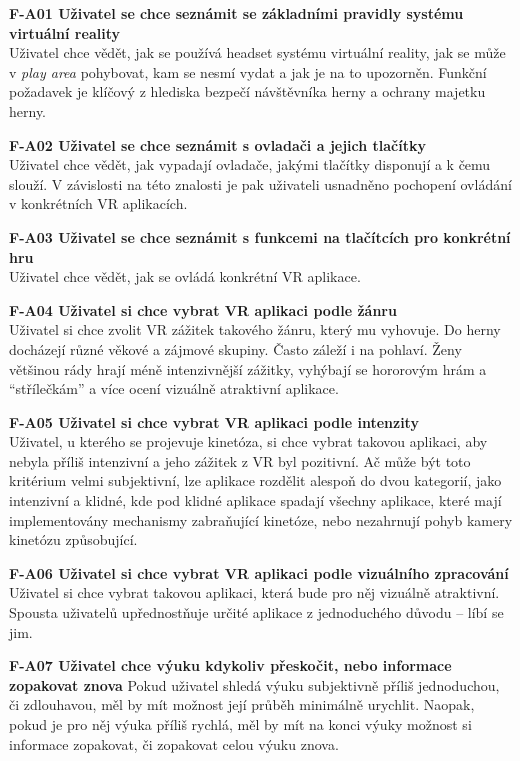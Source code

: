 \textbf{F-A01 Uživatel se chce seznámit se základními pravidly systému
virtuální reality}\\
Uživatel chce vědět, jak se používá headset systému virtuální reality,
jak se může v \emph{play area} pohybovat, kam se nesmí vydat a jak je na
to upozorněn. Funkční požadavek je klíčový z hlediska bezpečí
návštěvníka herny a ochrany majetku herny.

\textbf{F-A02 Uživatel se chce seznámit s ovladači a jejich tlačítky}\\
Uživatel chce vědět, jak vypadají ovladače, jakými tlačítky disponují a
k čemu slouží. V závislosti na této znalosti je pak uživateli usnadněno
pochopení ovládání v konkrétních VR aplikacích.

\textbf{F-A03 Uživatel se chce seznámit s funkcemi na tlačítcích pro
konkrétní hru}\\
Uživatel chce vědět, jak se ovládá konkrétní VR aplikace.

\textbf{F-A04 Uživatel si chce vybrat VR aplikaci podle žánru}\\
Uživatel si chce zvolit VR zážitek takového žánru, který mu vyhovuje. Do
herny docházejí různé věkové a zájmové skupiny. Často záleží i na
pohlaví. Ženy většinou rády hrají méně intenzivnější zážitky, vyhýbají
se hororovým hrám a ``střílečkám'' a více ocení vizuálně atraktivní
aplikace. \autocite{ladiespreferences}

\textbf{F-A05 Uživatel si chce vybrat VR aplikaci podle intenzity}\\
Uživatel, u kterého se projevuje kinetóza, si chce vybrat takovou
aplikaci, aby nebyla příliš intenzivní a jeho zážitek z VR byl
pozitivní. Ač může být toto kritérium velmi subjektivní, lze aplikace
rozdělit alespoň do dvou kategorií, jako intenzivní a klidné, kde pod
klidné aplikace spadají všechny aplikace, které mají implementovány
mechanismy zabraňující kinetóze, nebo nezahrnují pohyb kamery kinetózu
způsobující.

\textbf{F-A06 Uživatel si chce vybrat VR aplikaci podle vizuálního
zpracování}\\
Uživatel si chce vybrat takovou aplikaci, která bude pro něj vizuálně
atraktivní. Spousta uživatelů upřednostňuje určité aplikace z
jednoduchého důvodu -- líbí se jim.

\textbf{F-A07 Uživatel chce výuku kdykoliv přeskočit, nebo informace
zopakovat znova} Pokud uživatel shledá výuku subjektivně příliš
jednoduchou, či zdlouhavou, měl by mít možnost její průběh minimálně
urychlit. Naopak, pokud je pro něj výuka příliš rychlá, měl by mít na
konci výuky možnost si informace zopakovat, či zopakovat celou výuku
znova.


